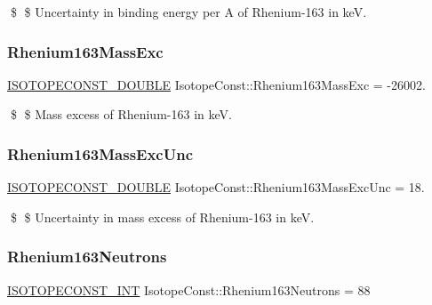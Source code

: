 \$ \$ Uncertainty in binding energy per A of Rhenium-\/163 in keV. \mbox{\label{group___isotope_const-_rhenium-_re163_gaa3cd4494c5b6710c410595c4ba241f6e}} 
\subsubsection{\texorpdfstring{Rhenium163\+Mass\+Exc}{Rhenium163MassExc}}
{\footnotesize\ttfamily \mbox{\hyperlink{group___isotope_const-_macros_ga8f45a7272ce02c0b4c65c44636ed719a}{I\+S\+O\+T\+O\+P\+E\+C\+O\+N\+S\+T\+\_\+\+D\+O\+U\+B\+LE}} Isotope\+Const\+::\+Rhenium163\+Mass\+Exc = -\/26002.}

\$ \$ Mass excess of Rhenium-\/163 in keV. \mbox{\label{group___isotope_const-_rhenium-_re163_gaf49faef2141d3ffd6a69cd48540b3431}} 
\subsubsection{\texorpdfstring{Rhenium163\+Mass\+Exc\+Unc}{Rhenium163MassExcUnc}}
{\footnotesize\ttfamily \mbox{\hyperlink{group___isotope_const-_macros_ga8f45a7272ce02c0b4c65c44636ed719a}{I\+S\+O\+T\+O\+P\+E\+C\+O\+N\+S\+T\+\_\+\+D\+O\+U\+B\+LE}} Isotope\+Const\+::\+Rhenium163\+Mass\+Exc\+Unc = 18.}

\$ \$ Uncertainty in mass excess of Rhenium-\/163 in keV. \mbox{\label{group___isotope_const-_rhenium-_re163_ga071b14705c95939c49013056a45c7258}} 
\subsubsection{\texorpdfstring{Rhenium163\+Neutrons}{Rhenium163Neutrons}}
{\footnotesize\ttfamily \mbox{\hyperlink{group___isotope_const-_macros_ga5f18360b3e99483a35c32d789e62621c}{I\+S\+O\+T\+O\+P\+E\+C\+O\+N\+S\+T\+\_\+\+I\+NT}} Isotope\+Const\+::\+Rhenium163\+Neutrons = 88}

